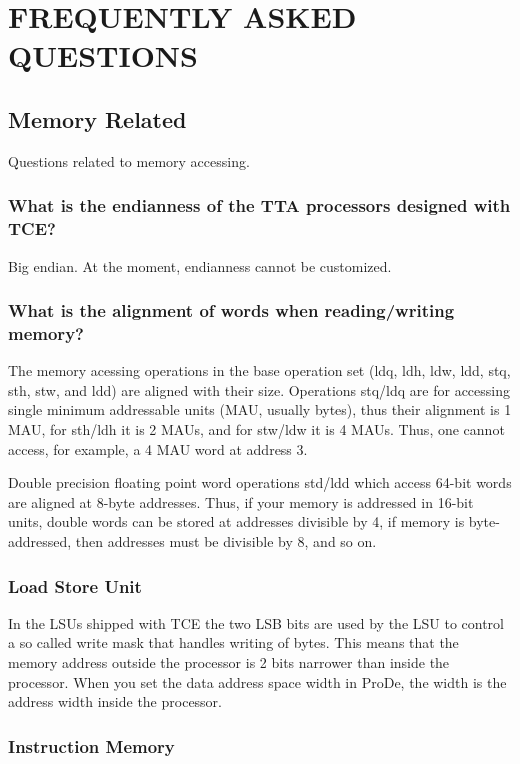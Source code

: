 \documentclass[twoside]{tceusermanual}
\begin{document}
\chapter{FREQUENTLY ASKED QUESTIONS}
\label{chapter:faq}

\section{Memory Related}

Questions related to memory accessing.

\subsection{What is the endianness of the TTA processors designed with TCE?}

Big endian. At the moment, endianness cannot be customized.

\subsection{What is the alignment of words when reading/writing memory?}

The memory acessing operations in the base operation set (ldq, ldh, ldw,
ldd, stq, sth, stw, and ldd) are aligned with their size. Operations stq/ldq
are for accessing single minimum addressable units (MAU, usually bytes),
thus their alignment is 1 MAU, for sth/ldh it is 2 MAUs, and for stw/ldw 
it is 4 MAUs. Thus, one cannot access, for example, a 4 MAU word at address
3. 

Double precision floating point word operations std/ldd which access
64-bit words are aligned at 8-byte addresses. Thus, if your memory is
addressed in 16-bit units, double words can be stored at addresses
divisible by 4, if memory is byte-addressed, then addresses must be
divisible by 8, and so on.

\subsection{Load Store Unit}
In the LSUs shipped with TCE the two LSB bits are used by the LSU to control
a so called write mask that handles writing of bytes. This means that the
memory address outside the processor is 2 bits narrower than inside the
processor. When you set the data address space width in ProDe, the width
is the address width inside the processor.

\subsection{Instruction Memory}
\end{document}
